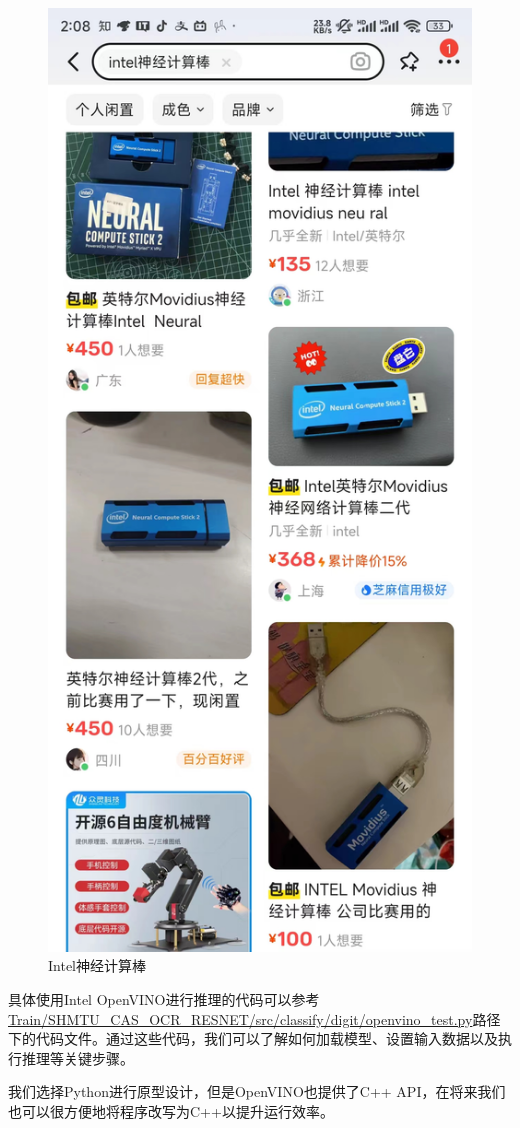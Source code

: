 \begin{figure}
	\centering
	\includegraphics[width=0.5\linewidth]{Resources/Picture/intel_stick}
	\caption{Intel神经计算棒}
	\label{fig:intelstick}
\end{figure}

具体使用Intel OpenVINO进行推理的代码可以参考\url{Train/SHMTU_CAS_OCR_RESNET/src/classify/digit/openvino_test.py}路径下的代码文件。通过这些代码，我们可以了解如何加载模型、设置输入数据以及执行推理等关键步骤。

我们选择Python进行原型设计，但是OpenVINO也提供了C++ API，在将来我们也可以很方便地将程序改写为C++以提升运行效率。
